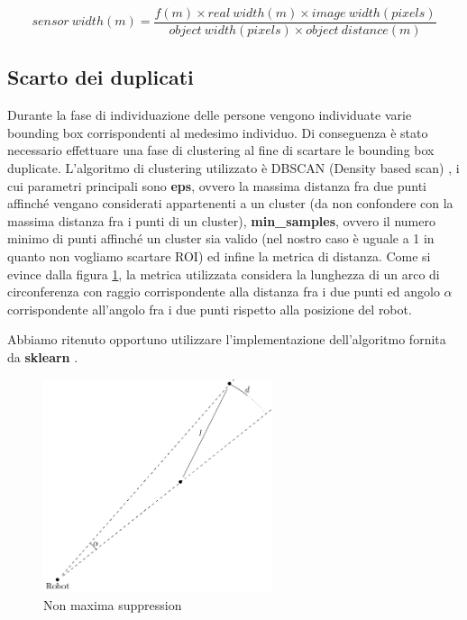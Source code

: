 \documentclass[a4paper]{article}
\begin{document}
	\begin{equation}\label{sensor_size}
	sensor~width(m) = 
	\frac{f(m) \times real~width(m) \times image~width(pixels)}
	{object~width(pixels) \times object~distance(m)}
	\end{equation}
	
	\subsection{Scarto dei duplicati}\label{subsec:Scarto-dei-duplicati}
	Durante la fase di individuazione delle persone vengono individuate varie
	bounding box corrispondenti al medesimo individuo. Di conseguenza è stato
	necessario effettuare una fase di clustering al fine di scartare le
	bounding box duplicate. L'algoritmo di clustering utilizzato è DBSCAN
	(Density based scan) \cite{dbscan}, i cui parametri principali sono
	\textbf{eps}, ovvero la massima distanza fra due punti affinché vengano
	considerati appartenenti a un cluster (da non confondere con la massima
	distanza fra i punti di un cluster), \textbf{min\_samples}, ovvero il
	numero minimo di punti affinché un cluster sia valido (nel nostro caso è
	uguale a 1 in quanto non vogliamo scartare ROI) ed infine la metrica di
	distanza.  Come si evince dalla figura \ref{fig:nms}, la metrica utilizzata
	considera la lunghezza di un arco di circonferenza con raggio
	corrispondente alla distanza fra i due punti ed angolo $\alpha$
	corrispondente  all'angolo fra i due punti rispetto alla posizione del
	robot.
	
	Abbiamo ritenuto opportuno utilizzare l'implementazione dell'algoritmo
	fornita da \textbf{sklearn} \cite{scikit}.
	
	\begin{figure}[H]
		\centering
		\includegraphics[width=0.6\textwidth]{./img/nms.pdf}
		\caption{Non maxima suppression}
		\label{fig:nms}
	\end{figure}
	
\end{document}
